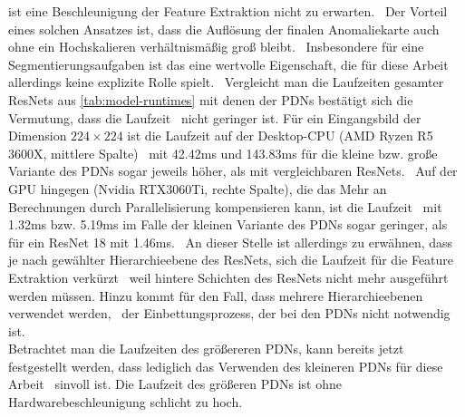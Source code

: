 ist eine Beschleunigung der Feature Extraktion nicht zu erwarten. \ 
Der Vorteil eines solchen Ansatzes ist, dass die Auflösung der finalen Anomaliekarte auch ohne ein Hochskalieren verhältnismäßig groß bleibt. \
Insbesondere für eine Segmentierungsaufgaben ist das eine wertvolle Eigenschaft, die für diese Arbeit allerdings keine explizite Rolle spielt. \
Vergleicht man die Laufzeiten gesamter ResNets aus \ref{tab:model-runtimes} mit denen der PDNs bestätigt sich die Vermutung, dass die Laufzeit \
nicht geringer ist. Für ein Eingangsbild der Dimension $224\times 224$ ist die Laufzeit auf der Desktop-CPU (AMD Ryzen R5 3600X, mittlere Spalte) \
mit \num{42,42}\si{\milli\second} und \num{143,83}\si{\milli\second} für die kleine bzw. große Variante des PDNs sogar jeweils höher, als mit vergleichbaren ResNets. \
Auf der GPU hingegen (Nvidia RTX3060Ti, rechte Spalte), die das Mehr an Berechnungen durch Parallelisierung kompensieren kann, ist die Laufzeit \
mit \num{1,32}\si{\milli\second} bzw. \num{5,19}\si{\milli\second} im Falle der kleinen Variante des PDNs sogar geringer, als für ein ResNet 18 mit \num{1,46}\si{\milli\second}. \
An dieser Stelle ist allerdings zu erwähnen, dass je nach gewählter Hierarchieebene des ResNets, sich die Laufzeit für die Feature Extraktion verkürzt \
weil hintere Schichten des ResNets nicht mehr ausgeführt werden müssen. Hinzu kommt für den Fall, dass mehrere Hierarchieebenen verwendet werden, \
der Einbettungsprozess, der bei den PDNs nicht notwendig ist. \\
Betrachtet man die Laufzeiten des größereren PDNs, kann bereits jetzt festgestellt werden, dass lediglich das Verwenden des kleineren PDNs für diese Arbeit \
sinvoll ist. Die Laufzeit des größeren PDNs ist ohne Hardwarebeschleunigung schlicht zu hoch. \\
